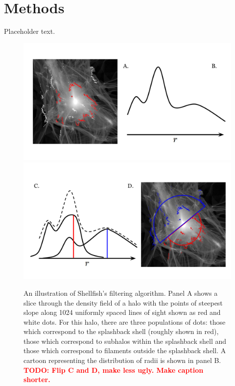 \documentclass[numberedappendix,apj]{emulateapj}
\begin{document}
\section{Methods}
\label{sec:methods}

Placeholder text.

\begin{figure}
   \centering
   \includegraphics[width=\columnwidth]{shell_finder_algo_a.pdf} \\
   \includegraphics[width=\columnwidth]{shell_finder_algo_b.pdf}
   \caption{An illustration of Shellfish's filtering algorithm. Panel A shows
      a slice through the density field of a halo with the points of steepest
      slope along 1024 uniformly spaced lines of sight shown as red and white
      dots. For this halo, there are three populations of dots: those which
      correspond to the splashback shell (roughly shown in red), those which
      correspond to subhalos within the splashback shell and those which
      correspond to filaments outside the splashback shell. A cartoon
      representing the distribution of radii is shown in panel B.
      \textcolor{red}{\textbf{TODO: Flip C and D, make less ugly. Make caption
      shorter.}}
   }
   \label{fig:shell_finder_algo}
\end{figure}
\end{document}
